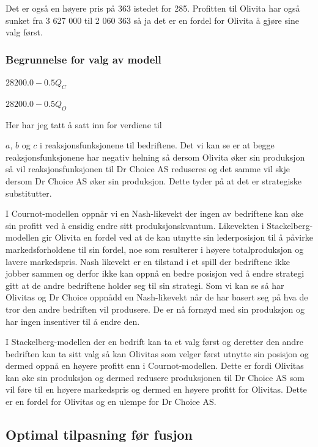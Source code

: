 \documentclass[
  12pt,
  a4paper,
  DIV=11,
  numbers=noendperiod]{scrartcl}
\begin{document}
Det er også en høyere pris på 363 istedet for 285. Profitten til Olivita
har også sunket fra 3 627 000 til 2 060 363 så ja det er en fordel for
Olivita å gjøre sine valg først.

\subsubsection{Begrunnelse for valg av
modell}\label{begrunnelse-for-valg-av-modell}

$\displaystyle 28200.0 - 0.5 Q_{C}$

$\displaystyle 28200.0 - 0.5 Q_{O}$

\hypertarget{begrunnelse}{Her har jeg tatt å satt inn for verdiene til}

\(a\), \(b\) og \(c\) i reaksjonsfunksjonene til bedriftene. Det vi kan
se er at begge reaksjonsfunksjonene har negativ helning så dersom
Olivita øker sin produksjon så vil reaksjonsfunksjonen til Dr Choice AS
reduseres og det samme vil skje dersom Dr Choice AS øker sin produksjon.
Dette tyder på at det er strategiske substitutter.

I Cournot-modellen oppnår vi en Nash-likevekt der ingen av bedriftene
kan øke sin profitt ved å ensidig endre sitt produksjonskvantum.
Likevekten i Stackelberg-modellen gir Olivita en fordel ved at de kan
utnytte sin lederposisjon til å påvirke markedsforholdene til sin
fordel, noe som resulterer i høyere totalproduksjon og lavere
markedspris. Nash likevekt er en tilstand i et spill der bedriftene ikke
jobber sammen og derfor ikke kan oppnå en bedre posisjon ved å endre
strategi gitt at de andre bedriftene holder seg til sin strategi. Som vi
kan se så har Olivitas og Dr Choice oppnådd en Nash-likevekt når de har
basert seg på hva de tror den andre bedriften vil produsere. De er nå
fornøyd med sin produksjon og har ingen insentiver til å endre den.

I Stackelberg-modellen der en bedrift kan ta et valg først og deretter
den andre bedriften kan ta sitt valg så kan Olivitas som velger først
utnytte sin posisjon og dermed oppnå en høyere profitt enn i
Cournot-modellen. Dette er fordi Olivitas kan øke sin produksjon og
dermed redusere produksjonen til Dr Choice AS som vil føre til en høyere
markedspris og dermed en høyere profitt for Olivitas. Dette er en fordel
for Olivitas og en ulempe for Dr Choice AS.

\clearpage

\subsection{Optimal tilpasning før
fusjon}\label{optimal-tilpasning-fuxf8r-fusjon}
\end{document}
